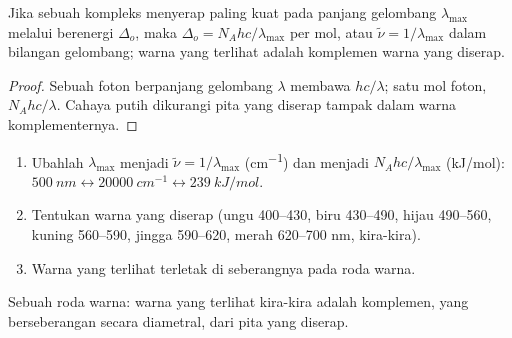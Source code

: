\begin{proposition}\label{prop:b2:ligand-field:colour}
Jika sebuah kompleks menyerap paling kuat pada panjang gelombang
$\lambda_{\max}$ melalui  berenergi $\Delta_o$, maka
$\Delta_o = N_Ahc/\lambda_{\max}$ per mol, atau $\tilde\nu = 1/\lambda_{\max}$ dalam
bilangan gelombang; warna yang terlihat adalah komplemen warna yang diserap.
\end{proposition}

\begin{proof}
Sebuah foton berpanjang gelombang $\lambda$ membawa $hc/\lambda$; satu mol foton, $N_Ahc/\lambda$.
Cahaya putih dikurangi pita yang diserap tampak dalam warna komplementernya.
\end{proof}

\begin{method}\label{met:b2:ligand-field:colour}
\begin{enumerate}
  \item Ubahlah $\lambda_{\max}$ menjadi $\tilde\nu = 1/\lambda_{\max}$ (\unit{cm^{-1}}) dan menjadi
        $N_Ahc/\lambda_{\max}$ (\unit{kJ/mol}): $\qty{500}{nm} \leftrightarrow \qty{20000}{cm^{-1}}
        \leftrightarrow \qty{239}{kJ/mol}$.
  \item Tentukan warna yang diserap (ungu 400--430, biru 430--490, hijau
        490--560, kuning 560--590, jingga 590--620, merah 620--700 nm, kira-kira).
  \item Warna yang terlihat terletak di seberangnya pada roda warna.
\end{enumerate}
\end{method}

\begin{omfigure}

{\small Sebuah roda warna: warna yang terlihat kira-kira adalah komplemen,
yang berseberangan secara diametral, dari pita yang diserap.}
\end{omfigure}

